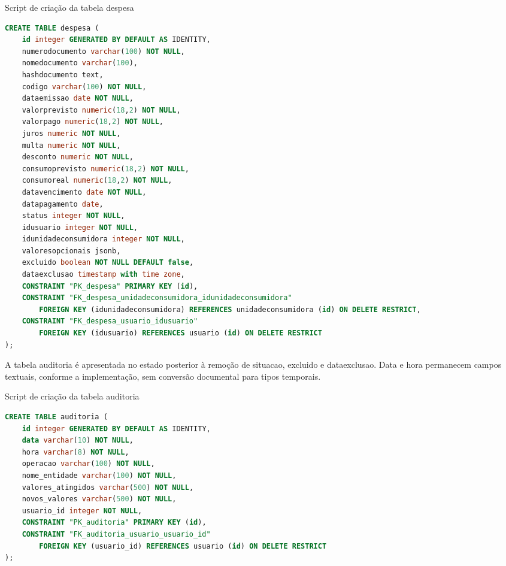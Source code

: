 \begin{quadro}[H]
\caption{Script de criação da tabela despesa}\label{qua:bd-despesa}
\begin{lstlisting}[language=SQL,breaklines=true,breakatwhitespace=false,frame=single,columns=fullflexible,basicstyle=\ttfamily\footnotesize]
CREATE TABLE despesa (
    id integer GENERATED BY DEFAULT AS IDENTITY,
    numerodocumento varchar(100) NOT NULL,
    nomedocumento varchar(100),
    hashdocumento text,
    codigo varchar(100) NOT NULL,
    dataemissao date NOT NULL,
    valorprevisto numeric(18,2) NOT NULL,
    valorpago numeric(18,2) NOT NULL,
    juros numeric NOT NULL,
    multa numeric NOT NULL,
    desconto numeric NOT NULL,
    consumoprevisto numeric(18,2) NOT NULL,
    consumoreal numeric(18,2) NOT NULL,
    datavencimento date NOT NULL,
    datapagamento date,
    status integer NOT NULL,
    idusuario integer NOT NULL,
    idunidadeconsumidora integer NOT NULL,
    valoresopcionais jsonb,
    excluido boolean NOT NULL DEFAULT false,
    dataexclusao timestamp with time zone,
    CONSTRAINT "PK_despesa" PRIMARY KEY (id),
    CONSTRAINT "FK_despesa_unidadeconsumidora_idunidadeconsumidora"
        FOREIGN KEY (idunidadeconsumidora) REFERENCES unidadeconsumidora (id) ON DELETE RESTRICT,
    CONSTRAINT "FK_despesa_usuario_idusuario"
        FOREIGN KEY (idusuario) REFERENCES usuario (id) ON DELETE RESTRICT
);
\end{lstlisting}
\end{quadro}

A tabela auditoria é apresentada no estado posterior à remoção de situacao, excluido e dataexclusao. Data e hora permanecem campos textuais, conforme a implementação, sem conversão documental para tipos temporais.

\begin{quadro}[H]
\caption{Script de criação da tabela auditoria}\label{qua:bd-auditoria}
\begin{lstlisting}[language=SQL,breaklines=true,breakatwhitespace=false,frame=single,columns=fullflexible,basicstyle=\ttfamily\footnotesize]
CREATE TABLE auditoria (
    id integer GENERATED BY DEFAULT AS IDENTITY,
    data varchar(10) NOT NULL,
    hora varchar(8) NOT NULL,
    operacao varchar(100) NOT NULL,
    nome_entidade varchar(100) NOT NULL,
    valores_atingidos varchar(500) NOT NULL,
    novos_valores varchar(500) NOT NULL,
    usuario_id integer NOT NULL,
    CONSTRAINT "PK_auditoria" PRIMARY KEY (id),
    CONSTRAINT "FK_auditoria_usuario_usuario_id"
        FOREIGN KEY (usuario_id) REFERENCES usuario (id) ON DELETE RESTRICT
);
\end{lstlisting}
\end{quadro}

